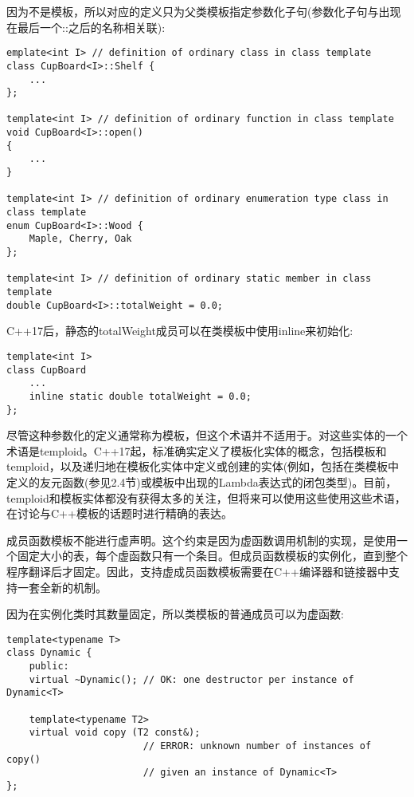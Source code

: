 因为不是模板，所以对应的定义只为父类模板指定参数化子句(参数化子句与出现在最后一个::之后的名称相关联):

\begin{lstlisting}[style=styleCXX]
emplate<int I> // definition of ordinary class in class template
class CupBoard<I>::Shelf {
	...
};

template<int I> // definition of ordinary function in class template
void CupBoard<I>::open()
{
	...
}

template<int I> // definition of ordinary enumeration type class in class template
enum CupBoard<I>::Wood {
	Maple, Cherry, Oak
};

template<int I> // definition of ordinary static member in class template
double CupBoard<I>::totalWeight = 0.0;
\end{lstlisting}

C++17后，静态的totalWeight成员可以在类模板中使用inline来初始化:

\begin{lstlisting}[style=styleCXX]
template<int I>
class CupBoard
	...
	inline static double totalWeight = 0.0;
};
\end{lstlisting}

尽管这种参数化的定义通常称为模板，但这个术语并不适用于。对这些实体的一个术语是temploid。C++17起，标准确实定义了模板化实体的概念，包括模板和temploid，以及递归地在模板化实体中定义或创建的实体(例如，包括在类模板中定义的友元函数(参见2.4节)或模板中出现的Lambda表达式的闭包类型)。目前，temploid和模板实体都没有获得太多的关注，但将来可以使用这些使用这些术语，在讨论与C++模板的话题时进行精确的表达。


成员函数模板不能进行虚声明。这个约束是因为虚函数调用机制的实现，是使用一个固定大小的表，每个虚函数只有一个条目。但成员函数模板的实例化，直到整个程序翻译后才固定。因此，支持虚成员函数模板需要在C++编译器和链接器中支持一套全新的机制。

因为在实例化类时其数量固定，所以类模板的普通成员可以为虚函数:

\begin{lstlisting}[style=styleCXX]
template<typename T>
class Dynamic {
	public:
	virtual ~Dynamic(); // OK: one destructor per instance of Dynamic<T>
	
	template<typename T2>
	virtual void copy (T2 const&);
						// ERROR: unknown number of instances of copy()
						// given an instance of Dynamic<T>
};
\end{lstlisting}

